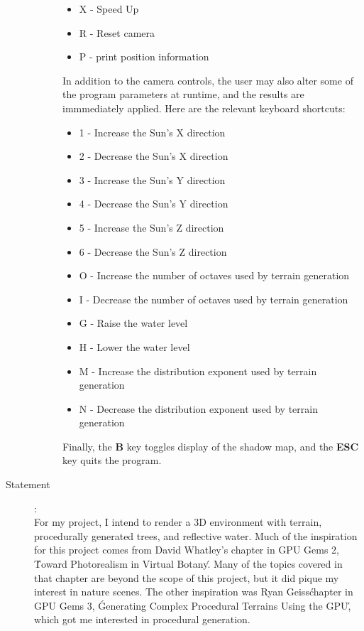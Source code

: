 \documentclass{article}
\begin{document}
\begin{description}
\begin{description}
\begin{itemize}
			\item X - Speed Up
			\item R - Reset camera
			\item P - print position information
		\end{itemize}
		In addition to the camera controls, the user may also alter some of the program parameters at runtime, and the results are immmediately applied. Here are the relevant keyboard shortcuts:
		\begin{itemize}
			\item 1 - Increase the Sun's X direction
			\item 2 - Decrease the Sun's X direction
			\item 3 - Increase the Sun's Y direction
			\item 4 - Decrease the Sun's Y direction
			\item 5 - Increase the Sun's Z direction
			\item 6 - Decrease the Sun's Z direction
			\item O - Increase the number of octaves used by terrain generation
			\item I - Decrease the number of octaves used by terrain generation
			\item G - Raise the water level
			\item H - Lower the water level
			\item M - Increase the distribution exponent used by terrain generation
			\item N - Decrease the distribution exponent used by terrain generation
		\end{itemize}
		Finally, the \textbf{B} key toggles display of the shadow map, and the \textbf{ESC} key quits the program.
	\end{description}

\item[Statement]:\\

	For my project, I intend to render a 3D environment with terrain, procedurally generated trees, and reflective water. Much of the inspiration for this project comes from David Whatley's chapter in GPU Gems 2, \'Toward Photorealism in Virtual Botany\'. Many of the topics covered in that chapter are beyond the scope of this project, but it did pique my interest in nature scenes. The other inspiration was Ryan Geiss\' chapter in GPU Gems 3, \'Generating Complex Procedural Terrains Using the GPU\', which got me interested in procedural generation.


\end{description}
\end{document}
